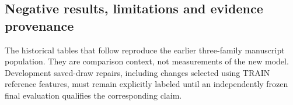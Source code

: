 \subsection{Negative results, limitations and evidence provenance}
The historical tables that follow reproduce the earlier three-family manuscript population.
They are comparison context, not measurements of the new model. Development saved-draw repairs,
including changes selected using TRAIN reference features, must remain explicitly labeled until
an independently frozen final evaluation qualifies the corresponding claim.
